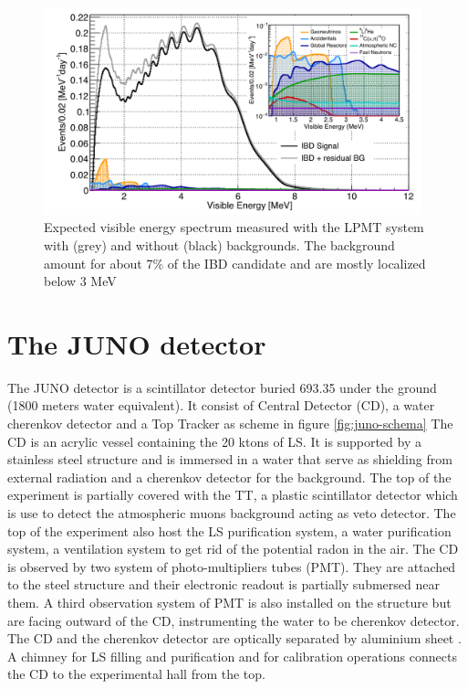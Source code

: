 \begin{figure}[ht]
  \centering
  \includegraphics[height=6cm]{images/juno/spectrum_with_background.png}
  \caption{Expected visible energy spectrum measured with the LPMT system with (grey) and without (black) backgrounds. The background amount for about 7\% of the IBD candidate and are mostly localized below 3 MeV \cite{juno_collaboration_sub-percent_2022}}
  \label{fig:spectrum_with_background}
\end{figure}


\section{The JUNO detector}

The JUNO detector is a scintillator detector buried 693.35 under the ground (1800 meters water equivalent). It consist of Central Detector (CD), a water cherenkov detector and a Top Tracker as scheme in figure \ref{fig:juno-schema}
The CD is an acrylic vessel containing the 20 ktons of LS. It is supported by a stainless steel structure and is immersed in a water that serve as shielding from external radiation and a cherenkov detector for the background. The top of the experiment is partially covered with the TT, a plastic scintillator detector which is use to detect the atmospheric muons background acting as veto detector.
The top of the experiment also host the LS purification system, a water purification system, a ventilation system to get rid of the potential radon in the air.
The CD is observed by two system of photo-multipliers tubes (PMT). They are attached to the steel structure and their electronic readout is partially submersed near them. A third observation system of PMT is also installed on the structure but are facing outward of the CD, instrumenting the water to be cherenkov detector. The CD and the cherenkov detector are optically separated by aluminium sheet . A chimney for LS filling and purification and for calibration operations connects the CD to the experimental hall from the top.

